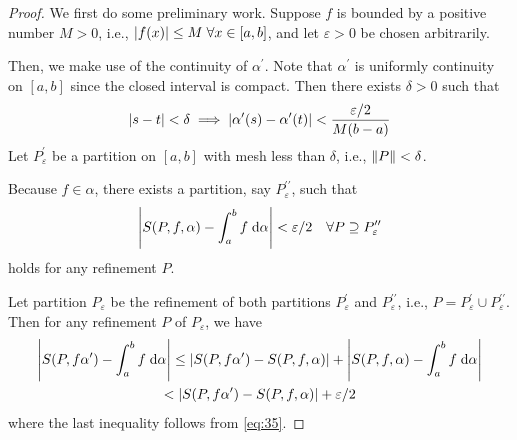 \documentclass[thmcnt=section, 12pt]{my-elegantbook}
\begin{document}
\begin{proof}
    We first do some preliminary work. Suppose $f$ is bounded by a positive number $M > 0$, i.e., $\left\lvert f(x) \right\rvert \leq M \; \forall x \in [a, b]$, and let $\varepsilon > 0$ be chosen arbitrarily.

    \par Then, we make use of the continuity of $\alpha^\prime$. Note that $\alpha^\prime$ is uniformly continuity on $[a, b]$ since the closed interval is compact. Then there exists $\delta > 0$ such that
    \begin{align}
        \left\lvert s-t \right\rvert < \delta
        \implies \left\lvert \alpha^\prime(s) - \alpha^\prime(t) \right\rvert < \frac{\varepsilon / 2}{M(b-a)}
        \label{eq:34}
    \end{align}
    Let $P_\varepsilon^\prime$ be a partition on $[a, b]$ with mesh less than $\delta$, i.e., $\left\lVert P \right\rVert < \delta$.

    \par Because $f \in \mathfrak{\alpha}$, there exists a partition, say $P_\varepsilon^{\prime\prime}$, such that
    \begin{align}
        \left\lvert S(P,f,\alpha) - \int_{a}^{b} f \; \mathrm{d}\alpha \right\rvert < \varepsilon / 2
        \quad \forall P \supseteq P_\varepsilon^{\prime\prime}
        \label{eq:35}
    \end{align}
    holds for any refinement $P$.

    Let partition $P_\varepsilon$ be the refinement of both partitions $P_\varepsilon^\prime$ and $P_\varepsilon^{\prime\prime}$, i.e., $P = P_\varepsilon^\prime \cup P_\varepsilon^{\prime\prime}$. Then for any refinement $P$ of $P_\varepsilon$, we have
    \begin{multline}
        \left\lvert S(P, f\alpha^\prime) - \int_{a}^{b}f \; \mathrm{d}\alpha \right\rvert
        \leq \left\lvert S(P, f\alpha^\prime) - S(P, f, \alpha) \right\rvert
        + \left\lvert S(P, f, \alpha) - \int_{a}^{b}f \; \mathrm{d}\alpha \right\rvert \\
        < \left\lvert S(P, f\alpha^\prime) - S(P, f, \alpha) \right\rvert + \varepsilon / 2
        \label{eq:36}
    \end{multline}
    where the last inequality follows from \eqref{eq:35}.


\end{proof}
\end{document}
